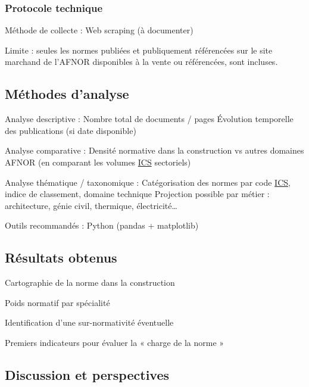 \documentclass[a4paper,12pt]{article}
\begin{document}
\subsubsection{Protocole technique}
\label{sec:org54b7fdf}
Méthode de collecte : Web scraping (à documenter)

Limite : seules les normes publiées et publiquement référencées sur le site marchand de l'AFNOR disponibles à la vente ou référencées, sont incluses.
\subsection{Méthodes d'analyse}
\label{sec:org10f9eeb}
Analyse descriptive :
    Nombre total de documents / pages
    Évolution temporelle des publications (si date disponible)

Analyse comparative :
    Densité normative dans la construction vs autres domaines AFNOR (en comparant les volumes \protect\hyperlink{gls-10}{\label{gls-10-use-2}ICS} sectoriels)

Analyse thématique / taxonomique :
    Catégorisation des normes par code \protect\hyperlink{gls-10}{\label{gls-10-use-3}ICS}, indice de classement, domaine technique
    Projection possible par métier : architecture, génie civil, thermique, électricité…

Outils recommandés : Python (pandas + matplotlib)
\subsection{Résultats obtenus}
\label{sec:orga8da7c7}
Cartographie de la norme dans la construction

Poids normatif par spécialité

Identification d’une sur-normativité éventuelle

Premiers indicateurs pour évaluer la « charge de la norme »
\subsection{Discussion et perspectives}
\label{sec:org9400144}
\clearpage
\end{document}
